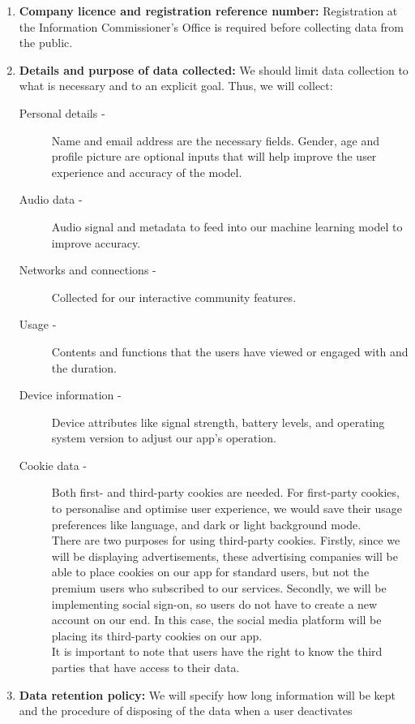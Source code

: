 \begin{enumerate}
    \item \textbf{Company licence and registration reference number:} Registration at the Information Commissioner's Office is required
    before collecting data from the public.
    \item \textbf{Details and purpose of data collected:} We should limit data collection to what is necessary and to an explicit goal.
    Thus, we will collect:
    \begin{description}
        \item[Personal details -] Name and email address are the necessary fields. Gender, age and profile picture are optional inputs 
        that will help improve the user experience and accuracy of the model. 
        \item[Audio data -] Audio signal and metadata to feed into our machine learning model to improve accuracy.
        \item[Networks and connections -] Collected for our interactive community features.
        \item[Usage -] Contents and functions that the users have viewed or engaged with and the duration.
        \item[Device information -] Device attributes like signal strength, battery levels, and operating system version to adjust our app's operation.
        \item[Cookie data -] Both first- and third-party cookies are needed. For first-party cookies, to personalise and optimise user
        experience, we would save their usage preferences like language, and dark or light background mode. 
        \\There are two purposes for using third-party cookies. Firstly, since we will be displaying advertisements, 
        these advertising companies will be able to place cookies on our app for standard users, but not the premium users who subscribed to our services. 
        Secondly, we will be implementing social sign-on, so users do not have to create a new account on our end. In this case, the social media 
        platform will be placing its third-party cookies on our app.
        \\It is important to note that users have the right to know the third parties that have access to their data.
    \end{description}
    \item \textbf{Data retention policy:} We will specify how long information will be kept and the procedure of disposing of the data when a user deactivates

\end{enumerate}
